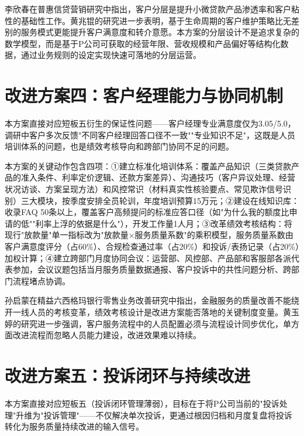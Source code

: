 李欣春在普惠信贷营销研究中指出，客户分层是提升小微贷款产品渗透率和客户粘性的基础性工作\cite{ref55}。黄兆锟的研究进一步表明，基于生命周期的客户维护策略比无差别的服务模式更能提升客户满意度和转介意愿\cite{ref38}。本方案的分层设计不是追求复杂的数学模型，而是基于P公司可获取的经营年限、营收规模和产品偏好等结构化数据，通过业务规则的设定实现快速可落地的分层运营。\par

\section{改进方案四：客户经理能力与协同机制}

本方案直接对应短板五衍生的保证性问题——客户经理专业满意度仅为3.05/5.0，调研中客户多次反馈"不同客户经理回答口径不一致""专业知识不足"，这既是人员培训体系的问题，也是绩效考核导向和跨部门协同不足的问题。\par

本方案的关键动作包含四项：①建立标准化培训体系：覆盖产品知识（三类贷款产品的准入条件、利率定价逻辑、还款方案差异）、沟通技巧（客户异议处理、经营状况访谈、方案呈现方法）和风控常识（材料真实性核验要点、常见欺诈信号识别）三大模块，按季度安排全员轮训，年度培训预算15万元；②建设在线知识库：收录FAQ 50条以上，覆盖客户高频提问的标准应答口径（如"为什么我的额度比申请的低""利率上浮的依据是什么"），开发工作量1人月；③改革绩效考核结构：将现行"放款量"单一指标改为"放款量×服务质量系数"的乘积模型，服务质量系数由客户满意度评分（占60\%）、合规检查通过率（占20\%）和投诉/表扬记录（占20\%）加权计算；④建立跨部门月度协同会议：运营部、风控部、产品部和客服部各派代表参加，会议议题包括当月服务质量数据通报、客户投诉中的共性问题分析、跨部门流程堵点协调。\par

孙启蒙在精益六西格玛银行零售业务改善研究中指出，金融服务的质量改善不能绕开一线人员的考核变革，绩效考核设计是改进方案能否落地的关键制度变量\cite{ref12}。黄玉婷的研究进一步强调，客户服务流程中的人员配置必须与流程设计同步优化，单方面改进流程而忽略人员能力建设，改进效果难以持续\cite{ref53}。\par

\section{改进方案五：投诉闭环与持续改进}

本方案直接对应短板五（投诉闭环管理薄弱），目标在于将P公司当前的"投诉处理"升维为"投诉管理"——不仅解决单次投诉，更通过根因归档和月度复盘将投诉转化为服务质量持续改进的输入信号。\par

